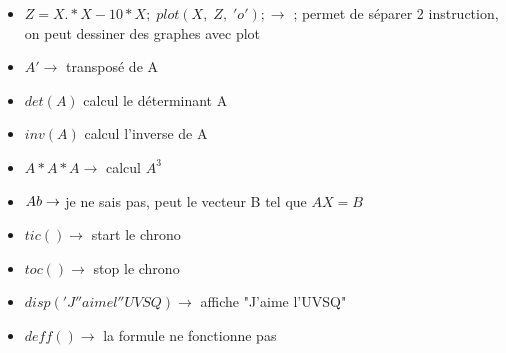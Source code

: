 \documentclass[12pt, letterpaper]{article}
\begin{document}
\begin{itemize}
\item $Z = X.*X-10*X; \; plot(X, \; Z, \; 'o'); \rightarrow$ ; permet de séparer 2 instruction, on peut dessiner des graphes avec plot
\item $A' \rightarrow$ transposé de A
\item $det(A)$ calcul le déterminant A
\item $inv(A)$ calcul l'inverse de A
\item $A*A*A \rightarrow$ calcul $A^3$
\item $A\\b \rightarrow$ je ne sais pas, peut le vecteur B tel que $AX = B$
\item $tic() \rightarrow$ start le chrono
\item $toc() \rightarrow$ stop le chrono
\item $disp('J''aime l''UVSQ) \rightarrow$ affiche "J'aime l'UVSQ"
\item $deff() \rightarrow$ la formule ne fonctionne pas
\end{itemize}
\end{document}
